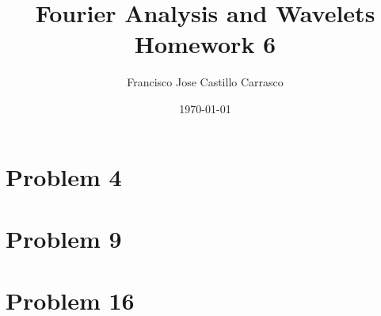 




\title{Fourier Analysis and Wavelets\\Homework 6}
\author{Francisco Jose Castillo Carrasco}
\date{\today}
\maketitle




\section*{Problem 4}


\section*{Problem 9}


\section*{Problem 16}



